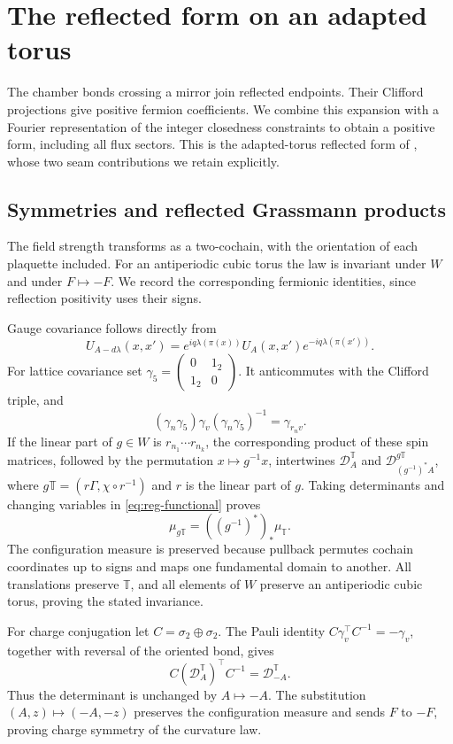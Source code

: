 \section{The reflected form on an adapted torus}\label{sec:finite-reflection}

The chamber bonds crossing a mirror join reflected endpoints. Their
Clifford projections give positive fermion coefficients. We combine
this expansion with a Fourier representation of the integer closedness
constraints to obtain a positive form, including all flux sectors.
This is the adapted-torus reflected form of
\cite[Sections~3.6--3.7]{ChamberQED}, whose two seam contributions
we retain explicitly.

\subsection{Symmetries and reflected Grassmann products}
\label{subsec:reg-symmetries}

The field strength transforms as a two-cochain, with the orientation
of each plaquette included. For an antiperiodic cubic torus the law is invariant
under $W$ and under $F\mapsto-F$. We record the corresponding
fermionic identities, since reflection positivity uses their signs.

Gauge covariance follows directly from
\[
 U_{A-d\lambda}(x,x')
 =e^{iq\lambda(\pi(x))}U_A(x,x')e^{-iq\lambda(\pi(x'))}.
\]
For lattice covariance set
$\gamma_5=\left(\begin{smallmatrix}0&1_2\\1_2&0\end{smallmatrix}\right)$.
It anticommutes with the Clifford triple, and
\[
 (\gamma_n\gamma_5)\gamma_v(\gamma_n\gamma_5)^{-1}
 =\gamma_{r_nv}.
\]
If the linear part of $g\in W$ is $r_{n_1}\cdots r_{n_k}$, the
corresponding product of these spin matrices, followed by the
permutation $x\mapsto g^{-1}x$, intertwines $\mathcal D_A^{\mathbb T}$ and
$\mathcal D_{(g^{-1})^*A}^{g\mathbb T}$, where
$g\mathbb T=(r\Gamma,\chi\circ r^{-1})$ and $r$ is the linear part
of $g$. Taking determinants and changing
variables in \eqref{eq:reg-functional} proves
\[
 \mu_{g\mathbb T}=((g^{-1})^*)_*\mu_{\mathbb T}.
\]
The configuration measure is preserved because pullback permutes
cochain coordinates up to signs and maps one fundamental domain
to another. All translations preserve $\mathbb T$, and all elements
of $W$ preserve an antiperiodic cubic torus, proving the stated
invariance.

For charge conjugation let $C=\sigma_2\oplus\sigma_2$. The Pauli
identity $C\gamma_v^\top C^{-1}=-\gamma_v$, together with reversal
of the oriented bond, gives
\[
 C(\mathcal D_A^{\mathbb T})^\top C^{-1}=\mathcal D_{-A}^{\mathbb T}.
\]
Thus the determinant is unchanged by $A\mapsto-A$. The substitution
$(A,z)\mapsto(-A,-z)$ preserves the configuration measure and sends
$F$ to $-F$, proving charge symmetry of the curvature law.

